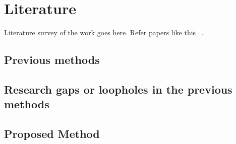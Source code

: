 \section{Literature}

Literature survey of the work goes here. Refer papers like this ~\cite{vaswani2017attention}.

\subsection{Previous methods}

\subsection{Research gaps or loopholes in the previous methods}

\subsection{Proposed Method}
